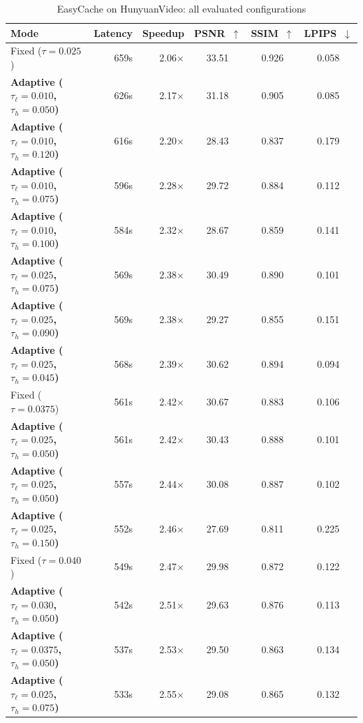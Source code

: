 \documentclass{article}
\begin{document}
\begin{table}[htbp]
\centering
\footnotesize
\setlength{\tabcolsep}{5pt}
\caption{EasyCache on HunyuanVideo: all evaluated configurations}
\label{tab:app-ec-hv}
\begin{tabular}{lrrccc}
\toprule
\textbf{Mode} & \textbf{Latency} & \textbf{Speedup} & \textbf{PSNR~$\uparrow$} & \textbf{SSIM~$\uparrow$} & \textbf{LPIPS~$\downarrow$} \\
\midrule
  Fixed ($\tau=0.025$) & 659s & 2.06$\times$ & 33.51 & 0.926 & 0.058 \\
  \textbf{Adaptive ($\tau_\ell=0.010$, $\tau_h=0.050$)} & 626s & 2.17$\times$ & 31.18 & 0.905 & 0.085 \\
  \textbf{Adaptive ($\tau_\ell=0.010$, $\tau_h=0.120$)} & 616s & 2.20$\times$ & 28.43 & 0.837 & 0.179 \\
  \textbf{Adaptive ($\tau_\ell=0.010$, $\tau_h=0.075$)} & 596s & 2.28$\times$ & 29.72 & 0.884 & 0.112 \\
  \textbf{Adaptive ($\tau_\ell=0.010$, $\tau_h=0.100$)} & 584s & 2.32$\times$ & 28.67 & 0.859 & 0.141 \\
  \textbf{Adaptive ($\tau_\ell=0.025$, $\tau_h=0.075$)} & 569s & 2.38$\times$ & 30.49 & 0.890 & 0.101 \\
  \textbf{Adaptive ($\tau_\ell=0.025$, $\tau_h=0.090$)} & 569s & 2.38$\times$ & 29.27 & 0.855 & 0.151 \\
  \textbf{Adaptive ($\tau_\ell=0.025$, $\tau_h=0.045$)} & 568s & 2.39$\times$ & 30.62 & 0.894 & 0.094 \\
  Fixed ($\tau=0.0375$) & 561s & 2.42$\times$ & 30.67 & 0.883 & 0.106 \\
  \textbf{Adaptive ($\tau_\ell=0.025$, $\tau_h=0.050$)} & 561s & 2.42$\times$ & 30.43 & 0.888 & 0.101 \\
  \textbf{Adaptive ($\tau_\ell=0.025$, $\tau_h=0.050$)} & 557s & 2.44$\times$ & 30.08 & 0.887 & 0.102 \\
  \textbf{Adaptive ($\tau_\ell=0.025$, $\tau_h=0.150$)} & 552s & 2.46$\times$ & 27.69 & 0.811 & 0.225 \\
  Fixed ($\tau=0.040$) & 549s & 2.47$\times$ & 29.98 & 0.872 & 0.122 \\
  \textbf{Adaptive ($\tau_\ell=0.030$, $\tau_h=0.050$)} & 542s & 2.51$\times$ & 29.63 & 0.876 & 0.113 \\
  \textbf{Adaptive ($\tau_\ell=0.0375$, $\tau_h=0.050$)} & 537s & 2.53$\times$ & 29.50 & 0.863 & 0.134 \\
  \textbf{Adaptive ($\tau_\ell=0.025$, $\tau_h=0.075$)} & 533s & 2.55$\times$ & 29.08 & 0.865 & 0.132 \\

\end{tabular}
\end{table}
\end{document}
